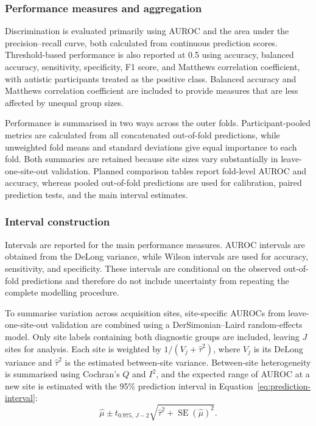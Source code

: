 \subsubsection{Performance measures and aggregation}
\label{subsubsec:performance-measures}

Discrimination is evaluated primarily using AUROC and the area under the precision--recall
curve, both calculated from continuous prediction scores. Threshold-based performance is
also reported at 0.5 using accuracy, balanced accuracy, sensitivity, specificity, F1 score,
and Matthews correlation coefficient, with autistic participants treated as the positive
class. Balanced accuracy and Matthews correlation coefficient are included to provide
measures that are less affected by unequal group sizes.

Performance is summarised in two ways across the outer folds. Participant-pooled metrics
are calculated from all concatenated out-of-fold predictions, while unweighted fold means
and standard deviations give equal importance to each fold. Both summaries are retained
because site sizes vary substantially in leave-one-site-out validation. Planned comparison
tables report fold-level AUROC and accuracy, whereas pooled out-of-fold predictions are
used for calibration, paired prediction tests, and the main interval estimates.

\subsubsection{Interval construction}
\label{subsubsec:interval-construction}

Intervals are reported for the main performance measures. AUROC intervals are obtained from
the DeLong variance, while Wilson intervals are used for accuracy,
sensitivity, and specificity. These intervals are conditional on the observed out-of-fold
predictions and therefore do not include uncertainty from repeating the complete modelling
procedure.

To summarise variation across acquisition sites, site-specific AUROCs from leave-one-site-out
validation are combined using a DerSimonian--Laird random-effects model. Only site labels containing both diagnostic groups are included,
leaving $J$ sites for analysis. Each site is weighted by
$1/(V_j+\hat{\tau}^2)$, where $V_j$ is its DeLong variance and $\hat{\tau}^2$ is the
estimated between-site variance. Between-site heterogeneity is summarised using Cochran's
$Q$ and $I^2$, and the expected range of AUROC at a new site is estimated with the 95\%
prediction interval in Equation~\eqref{eq:prediction-interval}:
\begin{equation}
\hat{\mu}
\pm
t_{0.975,\,J-2}
\sqrt{\hat{\tau}^2+\operatorname{SE}(\hat{\mu})^2}.
\label{eq:prediction-interval}
\end{equation}

